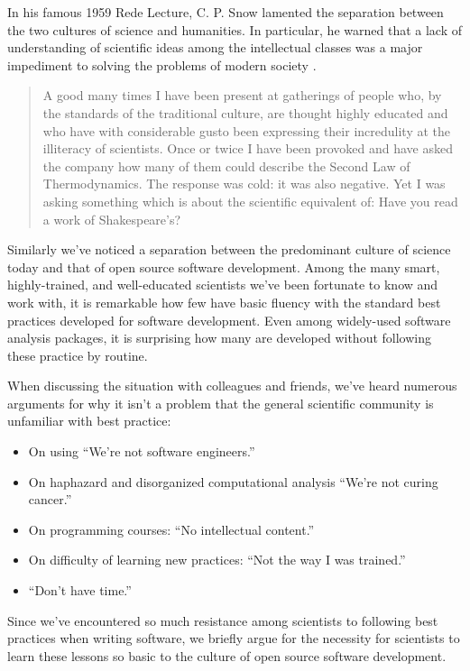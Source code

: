 \documentclass[ChapterTOCs,krantz2]{krantz} %
\begin{document}
In his famous 1959 Rede Lecture, C. P. Snow lamented the separation between the
two cultures of science and humanities.  In particular, he warned that a lack
of understanding of scientific ideas among the intellectual classes was a major
impediment to solving the problems of modern society \cite{snow1960two}.

\begin{quote}
A good many times I have been present at gatherings of people who, by the
standards of the traditional culture, are thought highly educated and who have
with considerable gusto been expressing their incredulity at the illiteracy of
scientists. Once or twice I have been provoked and have asked the company how
many of them could describe the Second Law of Thermodynamics. The response was
cold: it was also negative. Yet I was asking something which is about the
scientific equivalent of: Have you read a work of Shakespeare’s?
\end{quote}

Similarly we've noticed a separation between the predominant culture of
science today and that of open source software development. Among the
many smart, highly-trained, and well-educated scientists we've been
fortunate to know and work with, it is remarkable how few have basic
fluency with the standard best practices developed for software development.
Even among widely-used software analysis packages, it is surprising how
many are developed without following these practice by routine.

When discussing the situation with colleagues and friends, we've heard numerous
arguments for why it isn't a problem that the general scientific community
is unfamiliar with best practice:
\begin{itemize}
\item On using ``We're not software engineers.''
\item On haphazard and disorganized computational analysis ``We're not curing cancer.''
\item On programming courses: ``No intellectual content.''
\item On difficulty of learning new practices: ``Not the way I was trained.''
\item ``Don't have time.''
\end{itemize}

Since we've encountered so much resistance among scientists to following best
practices when writing software, we briefly argue for the necessity for
scientists to learn these lessons so basic to the culture of open source
software development.
\end{document}
